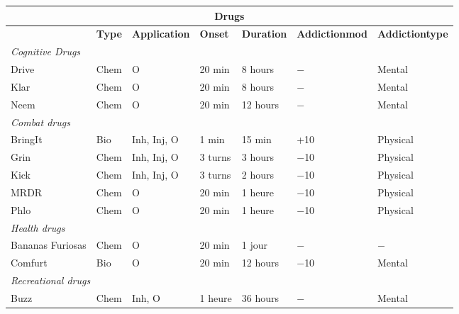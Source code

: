 {{\begin{table} \begin{tabularx}{\textwidth}{|X|l|l|l|l|X|X|} \hline

\multicolumn{7}{|c|}{\textbf{Drugs}}	\\ \hline

&\textbf{Type}	&\textbf{Application}	&\textbf{Onset}	&\textbf{Duration}	&\textbf{Addiction\newline mod}	&\textbf{Addiction\newline type} \\ \hline

\multicolumn{7}{|l|}{\emph{Cognitive Drugs}}	\\ \hline

Drive	&Chem	&O	&20 min &8 hours	&$-$	&Mental	\\ \hline

Klar	&Chem	&O	&20 min	&8 hours	&$-$	&Mental	\\ \hline

Neem	&Chem	&O	&20 min	&12 hours	&$-$	&Mental	\\ \hline

\multicolumn{7}{|l|}{\emph{Combat drugs}}	\\ \hline

BringIt	&Bio	&Inh, Inj, O	&1 min	&15 min	&+10	&Physical	\\ \hline

Grin	&Chem	&Inh, Inj, O	&3 turns	&3 hours	&$-$10	&Physical	\\ \hline

Kick	&Chem	&Inh, Inj, O	&3 turns	&2 hours	&$-$10	&Physical	\\ \hline

MRDR	&Chem	&O	&20 min	&1 heure	&$-$10	&Physical	\\ \hline

Phlo	&Chem	&O	&20 min	&1 heure	&$-$10	&Physical	\\ \hline

\multicolumn{7}{|l|}{\emph{Health drugs}}	\\ \hline

Bananas Furiosas	&Chem	&O	&20 min	&1 jour	&$-$	&$-$	\\ \hline

Comfurt	&Bio	&O	&20 min	&12 hours	&$-$10	&Mental	\\ \hline

\multicolumn{7}{|l|}{\emph{Recreational drugs}}	\\ \hline

Buzz	&Chem	&Inh, O	&1 heure	&36 hours	&$-$	&Mental	\\ \hline


\end{tabularx}
\end{table}}}

